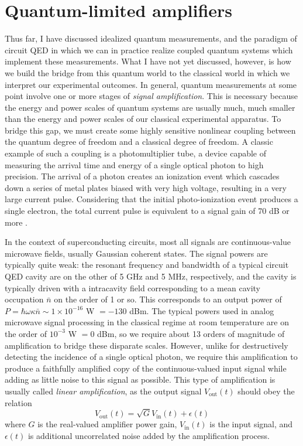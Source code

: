 
\chapter{Quantum-limited amplifiers}
\label{c:paramps}

Thus far, I have discussed idealized quantum measurements, and the paradigm of circuit QED in which we can in practice realize coupled quantum systems which implement these measurements.  What I have not yet discussed, however, is how we build the bridge from this quantum world to the classical world in which we interpret our experimental outcomes.  In general, quantum measurements at some point involve one or more stages of \textit{signal amplification}.  This is necessary because the energy and power scales of quantum systems are usually much, much smaller than the energy and power scales of our classical experimental apparatus.  To bridge this gap, we must create some highly sensitive nonlinear coupling between the quantum degree of freedom and a classical degree of freedom.  A classic example of such a coupling is a photomultiplier tube, a device capable of measuring the arrival time and energy of a single optical photon to high precision.  The arrival of a photon creates an ionization event which cascades down a series of metal plates biased with very high voltage, resulting in a very large current pulse.  Considering that the initial photo-ionization event produces a single electron, the total current pulse is equivalent to a signal gain of 70 dB or more \cite{Hakamata2002}.

In the context of superconducting circuits, most all signals are continuous-value microwave fields, usually Gaussian coherent states.  The signal powers are typically quite weak: the resonant frequency and bandwidth of a typical circuit QED cavity are on the other of 5 GHz and 5 MHz, respectively, and the cavity is typically driven with a intracavity field corresponding to a mean cavity occupation $\bar{n}$ on the order of 1 or so.  This corresponds to an output power of $P = \hbar \omega \kappa \bar{n} \sim 1 \times 10^{-16}$ W $ = -130$ dBm.  The typical powers used in analog microwave signal processing in the classical regime at room temperature are on the order of $10^{-3}$ W $= 0$ dBm, so we require about 13 orders of magnitude of amplification to bridge these disparate scales.  However, unlike for destructively detecting the incidence of a single optical photon, we require this amplification to produce a faithfully amplified copy of the continuous-valued input signal while adding as little noise to this signal as possible.  This type of amplification is usually called \textit{linear amplification}, as the output signal $V_{\textrm{out}}(t)$ should obey the relation
\begin{equation}
V_{\textrm{out}}(t) = \sqrt{G} V_{\textrm{in}}(t) + \epsilon(t)
\label{eq:lin_amp}
\end{equation}
where $G$ is the real-valued amplifier power gain, $V_{\textrm{in}}(t)$ is the input signal, and $\epsilon(t)$ is additional uncorrelated noise added by the amplification process.

